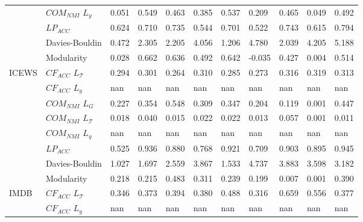 \begin{tabular}{lllllllllll}
    & $COM_{NMI}$ $L_y$ &     0.051 &    0.549 &  0.463 &  0.385 &  0.537 &   0.209 &    0.465 &                  0.049 &                  0.492 \\
    & $LP_{ACC}$ &     0.624 &    0.710 &  0.735 &  0.544 &  0.701 &   0.522 &    0.743 &                  0.615 &                  0.794 \\
    & Davies-Bouldin &     0.472 &    2.305 &  2.205 &  4.056 &  1.206 &   4.780 &    2.039 &                  4.205 &                  5.188 \\
    & Modularity &     0.028 &    0.662 &  0.636 &  0.492 &  0.642 &  -0.035 &    0.427 &                  0.004 &                  0.514 \\
ICEWS & $CF_{ACC}$ $L_\mathcal{T}$ &     0.294 &    0.301 &  0.264 &  0.310 &  0.285 &   0.273 &    0.316 &                  0.319 &                  0.313 \\
    & $CF_{ACC}$ $L_y$ &       nan &      nan &    nan &    nan &    nan &     nan &      nan &                    nan &                    nan \\
    & $COM_{NMI}$ $L_G$ &     0.227 &    0.354 &  0.548 &  0.309 &  0.347 &   0.204 &    0.119 &                  0.001 &                  0.447 \\
    & $COM_{NMI}$ $L_\mathcal{T}$ &     0.018 &    0.040 &  0.015 &  0.022 &  0.022 &   0.013 &    0.057 &                  0.001 &                  0.011 \\
    & $COM_{NMI}$ $L_y$ &       nan &      nan &    nan &    nan &    nan &     nan &      nan &                    nan &                    nan \\
    & $LP_{ACC}$ &     0.525 &    0.936 &  0.880 &  0.768 &  0.921 &   0.709 &    0.903 &                  0.895 &                  0.945 \\
    & Davies-Bouldin &     1.027 &    1.697 &  2.559 &  3.867 &  1.533 &   4.737 &    3.883 &                  3.598 &                  3.182 \\
    & Modularity &     0.218 &    0.215 &  0.483 &  0.311 &  0.239 &   0.199 &    0.007 &                  0.001 &                  0.390 \\
IMDB & $CF_{ACC}$ $L_\mathcal{T}$ &     0.346 &    0.373 &  0.394 &  0.380 &  0.488 &   0.316 &    0.659 &                  0.556 &                  0.377 \\
    & $CF_{ACC}$ $L_y$ &       nan &      nan &    nan &    nan &    nan &     nan &      nan &                    nan &                    nan \\

\end{tabular}
